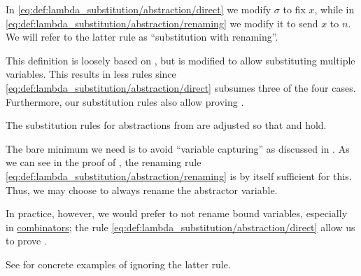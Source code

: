 \begin{comments}
  \item In \eqref{eq:def:lambda_substitution/abstraction/direct} we modify \( \sigma \) to fix \( x \), while in \eqref{eq:def:lambda_substitution/abstraction/renaming} we modify it to send \( x \) to \( n \). We will refer to the latter rule as \enquote{substitution with renaming}.
  \item This definition is loosely based on \cite[def. 1A7]{Hindley1997}, but is modified to allow substituting multiple variables. This results in less rules since \eqref{eq:def:lambda_substitution/abstraction/direct} subsumes three of the four cases. Furthermore, our substitution rules also allow proving .
\end{comments}

\begin{remark}\label{rem:renaming_substitution_rules}
  The substitution rules for abstractions from  are adjusted so that  and  hold.

  The bare minimum we need is to avoid \enquote{variable capturing} as discussed in . As we can see in the proof of , the renaming rule \eqref{eq:def:lambda_substitution/abstraction/renaming} is by itself sufficient for this. Thus, we may choose to always rename the abstractor variable.

  In practice, however, we would prefer to not rename bound variables, especially in \hyperref[def:lambda_combinator]{combinators}; the rule \eqref{eq:def:lambda_substitution/abstraction/direct} allow us to prove .

  See  for concrete examples of ignoring the latter rule.
\end{remark}

